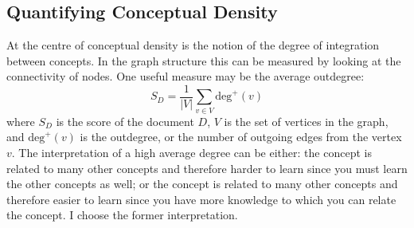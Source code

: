 \documentclass[12pt]{article}
\begin{document}
\subsection{Quantifying Conceptual Density} \label{sec:quantifying_conceptual_density}
At the centre of conceptual density is the notion of the degree of integration between concepts. In the graph structure this can be measured by looking at the connectivity of nodes. One useful measure may be the average outdegree:
\begin{equation} \label{eq:simple score}
    S_D = \frac{1}{|V|} \sum_{v \in V} \text{deg}^+(v)
\end{equation}
where $S_D$ is the score of the document $D$, $V$ is the set of vertices in the graph,  and $\text{deg}^+(v)$ is the outdegree, or the number of outgoing edges from the vertex $v$. The interpretation of a high average degree can be either: the concept is related to many other concepts and therefore harder to learn since you must learn the other concepts as well; or the concept is related to many other concepts and therefore easier to learn since you have more knowledge to which you can relate the concept. I choose the former interpretation. 

\end{document}
